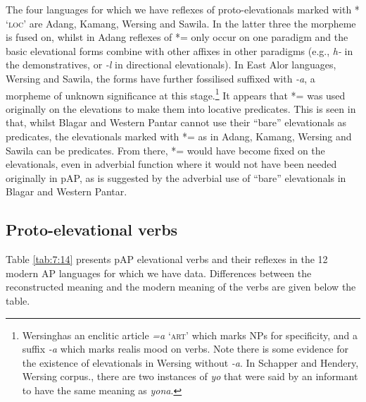 The four languages for which we have reflexes of proto-elevationals marked with *{\ng} `\textsc{loc}' are Adang, Kamang, Wersing and Sawila. In the latter three the morpheme is fused on, whilst in Adang reflexes of *={\ng} only occur on one paradigm and the basic elevational forms combine with other affixes in other paradigms (e.g., \textit{h}\textit{{\textepsilon}}\textit{{}-} in the demonstratives, or \textit{{}-l}\textit{{\textepsilon}} in directional elevationals). In East Alor languages, Wersing and Sawila, the forms have further fossilised suffixed with \textit{{}-a}, a morpheme of unknown significance at this stage.\footnote{Wersinghas an enclitic article \textit{=a} `\textsc{art}' which marks NPs for specificity, and a suffix \textit{{}-a} which marks realis mood on verbs. Note there is some evidence for the existence of elevationals in Wersing without \textit{{}-a}. In Schapper and Hendery, Wersing corpus., there are two instances of \textit{yo{\ng}} that were said by an informant to have the same meaning as \textit{yona}.} It appears that *={\ng} was used originally on the elevations to make them into locative predicates. This is seen in that, whilst Blagar and Western Pantar cannot use their ``bare'' elevationals as predicates, the elevationals marked with *={\ng} as in Adang, Kamang, Wersing and Sawila can be predicates. From there, *={\ng} would have become fixed on the elevationals, even in adverbial function where it would not have been needed originally in pAP, as is suggested by the adverbial use of ``bare'' elevationals in Blagar and Western Pantar.

\subsection{Proto-elevational verbs}\label{sec:7:4.2}
Table \ref{tab:7:14} presents pAP elevational verbs and their reflexes in the 12 modern AP languages for which we have data. Differences between the reconstructed meaning and the modern meaning of the verbs are given below the table. 

